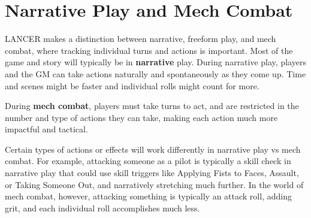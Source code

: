 \section{Narrative Play and Mech Combat}

LANCER makes a distinction between narrative, freeform play, and mech combat, where tracking
individual turns and actions is important. Most of the game and story will typically be in \textbf{narrative}
play. During narrative play, players and the GM can take actions naturally and spontaneously as
they come up. Time and scenes might be faster and individual rolls might count for more.

During \textbf{mech combat}, players must take turns to act, and are restricted in the number
and type of actions they can take, making each action much more impactful and tactical.

Certain types of actions or effects will work differently in narrative play vs mech combat.
For example, attacking someone as a pilot is typically a skill check in narrative play that could
use skill triggers like Applying Fists to Faces, Assault, or Taking Someone Out, and narratively
stretching much further. In the world of mech combat, however, attacking something is typically
an attack roll, adding grit, and each individual roll accomplishes much less.